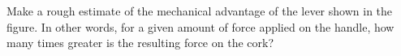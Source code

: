 Make a rough estimate of the mechanical advantage of the lever shown in the
figure. In other words, for a given amount of force applied on the handle,
how many times greater is the resulting force on the cork?
